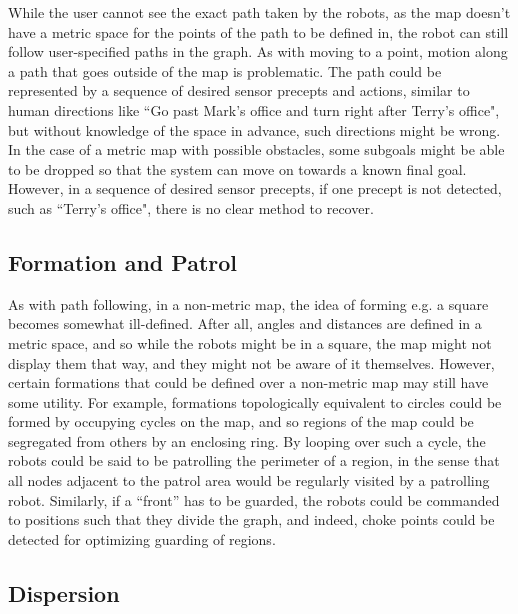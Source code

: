 While the user cannot see the exact path taken by the robots, as the map doesn't have a metric space for the points of the path to be defined in, the robot can still follow user-specified paths in the graph.
As with moving to a point, motion along a path that goes outside of the map is problematic. 
The path could be represented by a sequence of desired sensor precepts and actions, similar to human directions like ``Go past Mark's office and turn right after Terry's office", but without knowledge of the space in advance, such directions might be wrong. 
In the case of a metric map with possible obstacles, some subgoals might be able to be dropped so that the system can move on towards a known final goal. 
However, in a sequence of desired sensor precepts, if one precept is not detected, such as ``Terry's office", there is no clear method to recover. 

\subsection{Formation and Patrol}

As with path following, in a non-metric map, the idea of forming e.g. a square becomes somewhat ill-defined. 
After all, angles and distances are defined in a metric space, and so while the robots might be in a square, the map might not display them that way, and they might not be aware of it themselves. 
However, certain formations that could be defined over a non-metric map may still have some utility. 
For example, formations topologically equivalent to circles could be formed by occupying cycles on the map, and so regions of the map could be segregated from others by an enclosing ring. 
By looping over such a cycle, the robots could be said to be patrolling the perimeter of a region, in the sense that all nodes adjacent to the patrol area would be regularly visited by a patrolling robot. Similarly, if a ``front'' has to be guarded, the robots could be commanded to positions such that they divide the graph, and indeed, choke points could be detected for optimizing guarding of regions.

\subsection{Dispersion}

